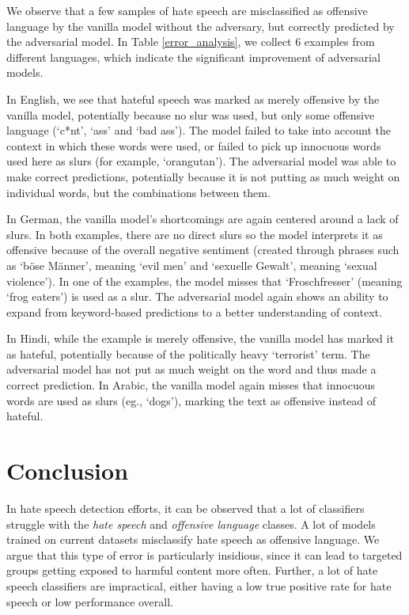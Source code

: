\documentclass[11pt]{article}
\begin{document}
	We observe that a few samples of hate speech are misclassified as offensive language by the vanilla model without the adversary, but correctly predicted by the adversarial model. In Table \ref{error_analysis}, we collect 6 examples from different languages, which indicate the significant improvement of adversarial models.
	
	In English, we see that hateful speech was marked as merely offensive by the vanilla model, potentially because no slur was used, but only some offensive language (`c*nt', `ass' and `bad ass'). The model failed to take into account the context in which these words were used, or failed to pick up innocuous words used here as slurs (for example, `orangutan'). The adversarial model was able to make correct predictions, potentially because it is not putting as much weight on individual words, but the combinations between them.
	
	In German, the vanilla model's shortcomings are again centered around a lack of slurs. In both examples, there are no direct slurs so the model interprets it as offensive because of the overall negative sentiment (created through phrases such as `böse Männer', meaning `evil men' and `sexuelle Gewalt', meaning `sexual violence'). In one of the examples, the model misses that `Froschfresser' (meaning `frog eaters') is used as a slur. The adversarial model again shows an ability to expand from keyword-based predictions to a better understanding of context.
	
	In Hindi, while the example is merely offensive, the vanilla model has marked it as hateful, potentially because of the politically heavy `terrorist' term. The adversarial model has not put as much weight on the word and thus made a correct prediction. In Arabic, the vanilla model again misses that innocuous words are used as slurs (eg., `dogs'), marking the text as offensive instead of hateful.
	
	
	\section{Conclusion}
	
	In hate speech detection efforts, it can be observed that a lot of classifiers struggle with the \textit{hate speech} and \textit{offensive language} classes. A lot of models trained on current datasets misclassify hate speech as offensive language. We argue that this type of error is particularly insidious, since it can lead to targeted groups getting exposed to harmful content more often. Further, a lot of hate speech classifiers are impractical, either having a low true positive rate for hate speech or low performance overall.
	
\end{document}
